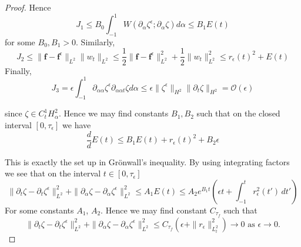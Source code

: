 \documentclass{article}[12pt]
\theoremstyle{Theorem}
\begin{document}
\begin{proof}
    Hence $$J_1 \leq  B_0\int_{-1}^1W(\partial_\alpha\zeta^\epsilon;\partial_\alpha\zeta)d\alpha \leq B_1E(t)$$
    for some $B_0,B_1 > 0$. Similarly, 
    $$J_2 \leq \|\boldsymbol{f}-\boldsymbol{f}^\epsilon\|_{L^2}\|w_t\|_{L^2} \leq \frac{1}{2}\|\boldsymbol{f}-\boldsymbol{f}^\epsilon\|^2_{L^2} + \frac{1}{2}\|w_t\|_{L^2}^2 
 \leq r_\epsilon(t)^2 + E(t)$$
     Finally, 
    $$J_3= \epsilon\int_{-1}^1\partial_{\alpha \alpha}\zeta^\epsilon\partial_{\alpha\alpha t}\zeta d\alpha \leq \epsilon\|\zeta^\epsilon\|_{H^2}\|\partial_{t}\zeta\|_{H^2} = \mathcal{O}(\epsilon)$$ 

    since $\zeta \in C^1_tH^2_\alpha$. Hence we may find constants $B_1,B_2$ such that on the closed interval $[0,\tau_\epsilon]$ we have
    \begin{equation}
        \frac{d}{d}E(t) \leq B_1 E(t) + r_\epsilon(t)^2 + B_2\epsilon
    \end{equation}

    This is exactly the set up in Gr\"onwall's inequality. By using integrating factors we see that on the interval $t \in[0,\tau_\epsilon]$
    \begin{equation}
        \|\partial_t\zeta - \partial_t\zeta^\epsilon \|^2_{L^2} + \|\partial_\alpha\zeta - \partial_\alpha\zeta^\epsilon \|_{L^2}^2\leq A_1E(t) \leq A_2e^{B_1t}(\epsilon t + \int_{-1}^tr_\epsilon^2(t')\,dt') 
    \end{equation}
    For some constants $A_1$, $A_2$. Hence we may find constant $C_{\tau_f}$ such that 
    \begin{equation}
        \|\partial_t\zeta - \partial_t\zeta^\epsilon \|^2_{L^2} + \|\partial_\alpha\zeta - \partial_\alpha\zeta^\epsilon \|_{L^2}^2\leq C_{\tau_f}(\epsilon + \|r_\epsilon\|^2_{L^2_t}) \rightarrow 0 \text{ as $\epsilon \rightarrow 0$.}
        \label{dt da inequality equation}
    \end{equation}
    \newline
    

\end{proof}
\end{document}
